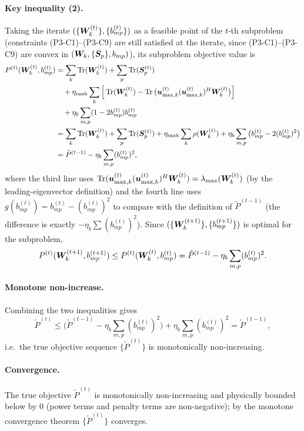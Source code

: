 \paragraph{Key inequality (2).} Taking the iterate $(\{\bm{W}_k^{(t)}\}, \{b_{mp}^{(t)}\})$ as a feasible point of the $t$-th subproblem (constraints (P3-C1)--(P3-C9) are still satisfied at the iterate, since (P3-C1)--(P3-C9) are convex in $(\bm{W}_k, \{\bm{S}_p\}, b_{mp})$), its subproblem objective value is
\begin{align*}
P^{(t)}(\bm{W}_k^{(t)}, b_{mp}^{(t)}) 
&= \sum_k \operatorname{Tr}(\bm{W}_k^{(t)}) + \sum_p \operatorname{Tr}(\bm{S}_p^{(t)}) \\
&\quad + \eta_{\text{rank}} \sum_k \Big[\operatorname{Tr}(\bm{W}_k^{(t)}) - \operatorname{Tr}\big(\bm{u}_{\max,k}^{(t)} (\bm{u}_{\max,k}^{(t)})^H \bm{W}_k^{(t)}\big)\Big] \\
&\quad + \eta_b \sum_{m,p} (1 - 2b_{mp}^{(t)}) b_{mp}^{(t)} \\
&= \sum_k \operatorname{Tr}(\bm{W}_k^{(t)}) + \sum_p \operatorname{Tr}(\bm{S}_p^{(t)}) + \eta_{\text{rank}} \sum_k \rho(\bm{W}_k^{(t)}) + \eta_b \sum_{m,p} \big(b_{mp}^{(t)} - 2(b_{mp}^{(t)})^2\big) \\
&= \tilde{P}^{(t-1)} - \eta_b \sum_{m,p} (b_{mp}^{(t)})^2,
\end{align*}
where the third line uses $\operatorname{Tr}(\bm{u}_{\max,k}^{(t)} (\bm{u}_{\max,k}^{(t)})^H \bm{W}_k^{(t)}) = \lambda_{\max}(\bm{W}_k^{(t)})$ (by the leading-eigenvector definition) and the fourth line uses $g(b_{mp}^{(t)}) = b_{mp}^{(t)} - (b_{mp}^{(t)})^2$ to compare with the definition of $\tilde{P}^{(t-1)}$ (the difference is exactly $-\eta_b \sum (b_{mp}^{(t)})^2$). Since $(\{\bm{W}_k^{(t+1)}\}, \{b_{mp}^{(t+1)}\})$ is optimal for the subproblem,
\[
P^{(t)}(\bm{W}_k^{(t+1)}, b_{mp}^{(t+1)}) \leq P^{(t)}(\bm{W}_k^{(t)}, b_{mp}^{(t)}) = \tilde{P}^{(t-1)} - \eta_b \sum_{m,p} (b_{mp}^{(t)})^2.
\]

\paragraph{Monotone non-increase.} Combining the two inequalities gives
\[
\tilde{P}^{(t)} \leq \big(\tilde{P}^{(t-1)} - \eta_b \sum_{m,p} (b_{mp}^{(t)})^2\big) + \eta_b \sum_{m,p} (b_{mp}^{(t)})^2 = \tilde{P}^{(t-1)},
\]
i.e.\ the true objective sequence $\{\tilde{P}^{(t)}\}$ is monotonically non-increasing.

\paragraph{Convergence.} The true objective $\tilde{P}^{(t)}$ is monotonically non-increasing and physically bounded below by $0$ (power terms and penalty terms are non-negative); by the monotone convergence theorem $\{\tilde{P}^{(t)}\}$ converges.

